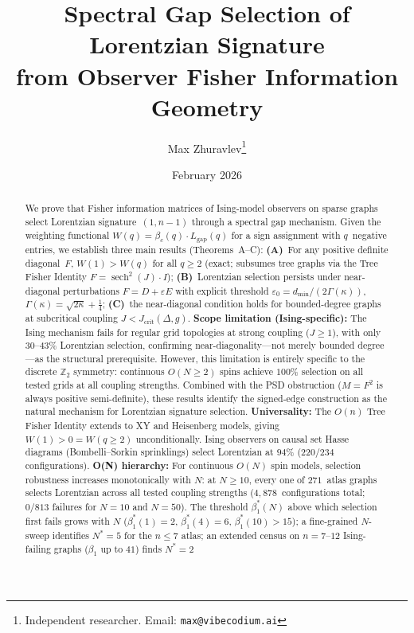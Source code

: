 \documentclass[11pt]{article}
\title{Spectral Gap Selection of Lorentzian Signature\\
from Observer Fisher Information Geometry}
\author{Max Zhuravlev\thanks{Independent researcher. Email: \texttt{max@vibecodium.ai}}}
\date{February 2026}
\theoremstyle{definition}
\theoremstyle{remark}
\begin{document}
\maketitle

\begin{abstract}
We prove that Fisher information matrices of Ising-model observers on
sparse graphs select Lorentzian signature~$(1,n{-}1)$ through a spectral gap
mechanism. Given the weighting functional $W(q) = \beta_c(q) \cdot
L_{\mathrm{gap}}(q)$ for a sign assignment with $q$~negative entries,
we establish three main results (Theorems~A--C):
\textbf{(A)}~For any positive definite diagonal~$F$, $W(1) > W(q)$ for all
$q \geq 2$ (exact; subsumes tree graphs via the Tree Fisher Identity
$F = \operatorname{sech}^2(J) \cdot I$);
\textbf{(B)}~Lorentzian selection persists under near-diagonal perturbations
$F = D + \varepsilon E$ with explicit threshold
$\varepsilon_0 = d_{\min}/(2\Gamma(\kappa))$, $\Gamma(\kappa) = \sqrt{2\kappa} + \tfrac{1}{4}$;
\textbf{(C)}~the near-diagonal condition holds for bounded-degree graphs at
subcritical coupling $J < J_{\mathrm{crit}}(\Delta, g)$.
\textbf{Scope limitation (Ising-specific):} The Ising mechanism fails for regular grid
topologies at strong coupling ($J \geq 1$), with only 30--43\% Lorentzian
selection, confirming near-diagonality---not merely bounded degree---as the
structural prerequisite. However, this limitation is entirely specific to the
discrete $\mathbb{Z}_2$ symmetry: continuous $O(N \geq 2)$ spins achieve $100\%$
selection on all tested grids at all coupling strengths. Combined with the PSD obstruction ($M = F^2$ is always
positive semi-definite), these results identify the signed-edge construction
as the natural mechanism for Lorentzian signature selection.
\textbf{Universality:} The $O(n)$ Tree Fisher Identity extends to XY and
Heisenberg models, giving $W(1) > 0 = W(q \geq 2)$ unconditionally.
Ising observers on causal set Hasse diagrams (Bombelli--Sorkin sprinklings)
select Lorentzian at $94\%$ ($220/234$ configurations).
\textbf{O(N) hierarchy:} For continuous $O(N)$ spin models, selection robustness
increases monotonically with $N$: at $N \geq 10$, every one of $271$~atlas
graphs selects Lorentzian across all tested coupling strengths ($4{,}878$~configurations
total; $0/813$ failures for $N = 10$ and $N = 50$). The threshold $\beta_1^*(N)$
above which selection first fails grows with $N$ ($\beta_1^*(1) = 2$,
$\beta_1^*(4) = 6$, $\beta_1^*(10) > 15$); a fine-grained $N$-sweep
identifies $N^* = 5$ for the $n \leq 7$ atlas; an extended census on
$n = 7$--$12$ Ising-failing graphs ($\beta_1$ up to $41$) finds $N^* = 2$

\end{abstract}
\end{document}
